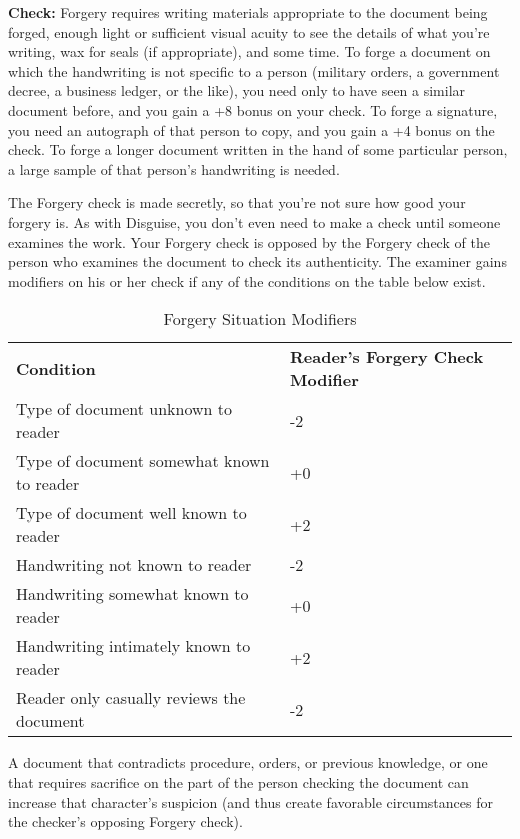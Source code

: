 
\textbf{Check:} Forgery requires writing materials appropriate to the document 
being forged, enough light or sufficient visual acuity to see the details of what 
you're writing, wax for seals (if appropriate), and some time. To forge a document 
on which the handwriting is not specific to a person (military orders, a government 
decree, a business ledger, or the like), you need only to have seen a similar document 
before, and you gain a +8 bonus on your check. To forge a signature, you need an 
autograph of that person to copy, and you gain a +4 bonus on the check. To forge 
a longer document written in the hand of some particular person, a large sample 
of that person's handwriting is needed.

The Forgery check is made secretly, so that you're not sure how good your forgery 
is. As with Disguise, you don't even need to make a check until someone examines 
the work. Your Forgery check is opposed by the Forgery check of the person who 
examines the document to check its authenticity. The examiner gains modifiers on 
his or her check if any of the conditions on the table below exist.

\begin{table}[htb]
\caption{Forgery Situation Modifiers}
\centering
\begin{tabular}{l p{2.7cm}}
\textbf{Condition} & \textbf{Reader's Forgery Check Modifier}\\
Type of document unknown to reader & -2\\
Type of document somewhat known to reader & +0\\
Type of document well known to reader & +2\\
Handwriting not known to reader & -2\\
Handwriting somewhat known to reader & +0\\
Handwriting intimately known to reader & +2\\
Reader only casually reviews the document & -2\\
\end{tabular}
\end{table}

A document that contradicts procedure, orders, or previous knowledge, or one that 
requires sacrifice on the part of the person checking the document can increase 
that character's suspicion (and thus create favorable circumstances for the checker's 
opposing Forgery check).

